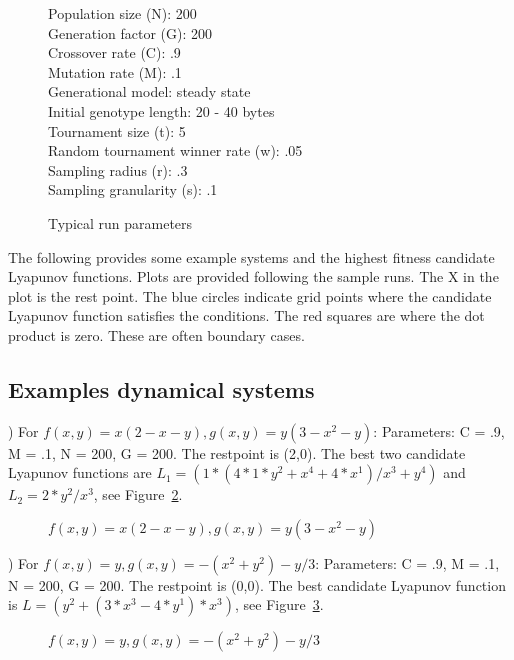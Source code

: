 \documentclass[12pt]{article}
\begin{document}
\begin{figure}[tbh]
{\footnotesize
Population size (N): 200\\
Generation factor (G): 200\\
Crossover rate (C): .9\\
Mutation rate (M): .1\\
Generational model: steady state\\
Initial genotype length: 20 - 40 bytes\\
Tournament size (t): 5\\
Random tournament winner rate (w): .05\\
Sampling radius (r):  .3\\
Sampling granularity (s): .1
}
\caption{Typical run parameters\label{parameters}}
\end{figure}

The following provides some example systems and the highest fitness
candidate Lyapunov functions.  Plots are provided following the sample
runs.  The X in the plot is the rest point.  The blue circles indicate
grid points where the candidate Lyapunov function  satisfies the
conditions.  The red squares are where the dot product
is zero.  These are often boundary cases.

\subsection{Examples dynamical systems}

) For {\color{ExampleDarkBlue}$f(x,y) = x(2-x-y), g(x,y) = y(3-x^2-y)$}: 
Parameters:  
C = .9, M = .1, N = 200, G = 200. The restpoint is (2,0).
The best two candidate Lyapunov functions are 
$L_1 = (1*(4*1*y^2+x^4+4*x^1)/x^3+y^4)$ and $L_2 = 2*y^2/x^3$, 
see Figure~\ref{one}.
\begin{figure}[tbh]
\caption{\label{one}$f(x,y) = x(2-x-y), g(x,y) = y(3-x^2-y)$}
\end{figure}

) For {\color{ExampleDarkBlue}$f(x,y) = y, g(x,y) = -(x^2+y^2)-y/3$}:
Parameters: C = .9, M = .1, N = 200, G = 200. The restpoint is (0,0).
The best candidate Lyapunov function is
$L = (y^2+(3*x^3-4*y^1)*x^3)$, see Figure~\ref{two}.
\begin{figure}[thb]
\caption{\label{two}$f(x,y) = y, g(x,y) = -(x^2+y^2)-y/3$}
\end{figure}
\end{document}
